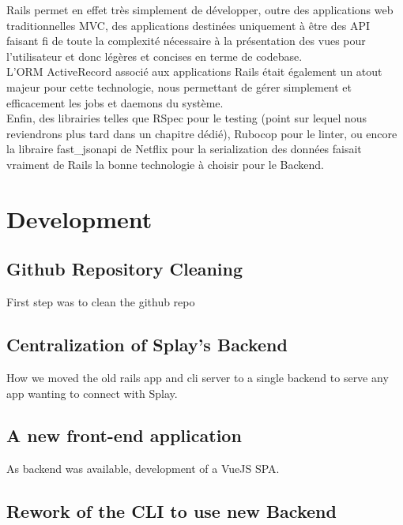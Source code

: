 \documentclass{eplmastersthesis}
\begin{document}
        Rails permet en effet très simplement de développer, outre des
        applications web traditionnelles MVC, des applications destinées uniquement
        à être des API faisant fi de toute la complexité nécessaire à la
        présentation des vues pour l'utilisateur et donc légères et concises
        en terme de codebase.\\
        L'ORM ActiveRecord associé aux applications Rails était également un
        atout majeur pour cette technologie, nous permettant de gérer
        simplement et efficacement les jobs et daemons du système.\\
        Enfin, des librairies telles que RSpec pour le testing (point sur
        lequel nous reviendrons plus tard dans un chapitre dédié), Rubocop pour
        le linter, ou encore la libraire fast\_jsonapi de Netflix pour la
        serialization des données faisait vraiment de Rails la bonne technologie
        à choisir pour le Backend.

    \section{Development}

      \subsection{Github Repository Cleaning}

        First step was to clean the github repo

      \subsection{Centralization of Splay's Backend}

        How we moved the old rails app and cli server to a single backend
        to serve any app wanting to connect with Splay.

      \subsection{A new front-end application}

        As backend was available, development of a VueJS SPA.

      \subsection{Rework of the CLI to use new Backend}
\end{document}
